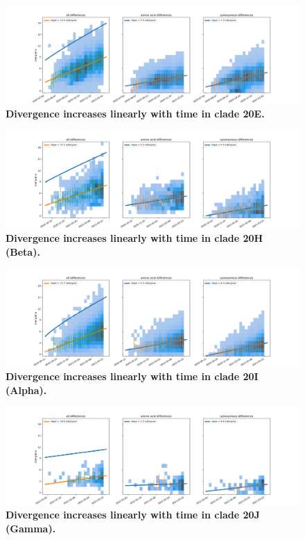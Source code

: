 \begin{figure}
    \includegraphics[width=\textwidth]{figures/rtt/20E_rtt.png}
    \caption{{\bf Divergence increases linearly with time in clade 20E.}
    \label{fig:20E_divergence}}
\end{figure}

\begin{figure}
    \includegraphics[width=\textwidth]{figures/rtt/20H_rtt.png}
    \caption{{\bf Divergence increases linearly with time in clade 20H (Beta).}
    \label{fig:20H_divergence}}
\end{figure}

\begin{figure}
    \includegraphics[width=\textwidth]{figures/rtt/20I_rtt.png}
    \caption{{\bf Divergence increases linearly with time in clade 20I (Alpha).}
    \label{fig:20I_divergence}}
\end{figure}

\begin{figure}
    \includegraphics[width=\textwidth]{figures/rtt/20J_rtt.png}
    \caption{{\bf Divergence increases linearly with time in clade 20J (Gamma).}
    \label{fig:20J_divergence}}
\end{figure}


